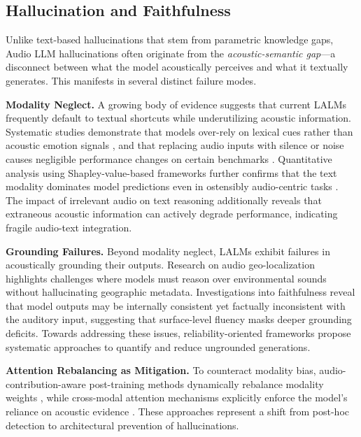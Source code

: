 \documentclass{llmxive}
\begin{document}
\subsection{Hallucination and Faithfulness}
Unlike text-based hallucinations that stem from parametric knowledge gaps, Audio LLM hallucinations often originate from the \textit{acoustic-semantic gap}---a disconnect between what the model acoustically perceives and what it textually generates. This manifests in several distinct failure modes.

\textbf{Modality Neglect.} A growing body of evidence suggests that current LALMs frequently default to textual shortcuts while underutilizing acoustic information. Systematic studies demonstrate that models over-rely on lexical cues rather than acoustic emotion signals \cite{chen2025audio}, and that replacing audio inputs with silence or noise causes negligible performance changes on certain benchmarks \cite{wang2025audio}. Quantitative analysis using Shapley-value-based frameworks further confirms that the text modality dominates model predictions even in ostensibly audio-centric tasks \cite{morais2025investigating}. The impact of irrelevant audio on text reasoning \cite{li2025silence} additionally reveals that extraneous acoustic information can actively degrade performance, indicating fragile audio-text integration.

\textbf{Grounding Failures.} Beyond modality neglect, LALMs exhibit failures in acoustically grounding their outputs. Research on audio geo-localization \cite{zhang2026sonar} highlights challenges where models must reason over environmental sounds without hallucinating geographic metadata. Investigations into faithfulness \cite{jain2025investigating} reveal that model outputs may be internally consistent yet factually inconsistent with the auditory input, suggesting that surface-level fluency masks deeper grounding deficits. Towards addressing these issues, reliability-oriented frameworks \cite{ma2025towards} propose systematic approaches to quantify and reduce ungrounded generations.


\textbf{Attention Rebalancing as Mitigation.} To counteract modality bias, audio-contribution-aware post-training methods dynamically rebalance modality weights \cite{he2025measuring}, while cross-modal attention mechanisms explicitly enforce the model's reliance on acoustic evidence \cite{wang2025pay}. These approaches represent a shift from post-hoc detection to architectural prevention of hallucinations.
\end{document}
